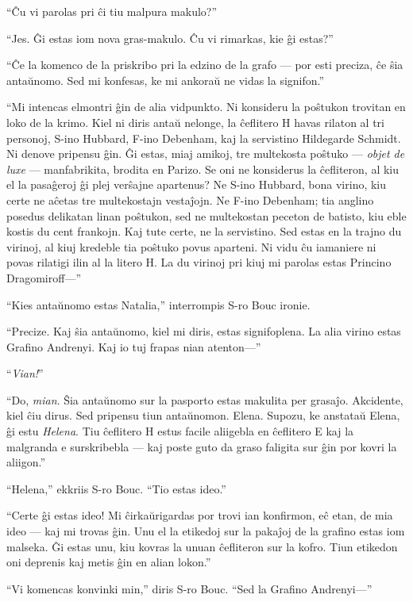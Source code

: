 ``Ĉu vi parolas pri ĉi tiu malpura makulo?''

``Jes. Ĝi estas iom nova gras-makulo. Ĉu vi rimarkas, kie ĝi estas?''

``Ĉe la komenco de la priskribo pri la edzino de la grafo --- por esti preciza, ĉe ŝia antaŭnomo. Sed mi konfesas, ke mi ankoraŭ ne vidas la signifon.''

``Mi intencas elmontri ĝin de alia vidpunkto. Ni konsideru la poŝtukon trovitan en loko de la krimo. Kiel ni diris antaŭ nelonge, la ĉeflitero H havas rilaton al tri personoj, S-ino Hubbard, F-ino Debenham, kaj la servistino Hildegarde Schmidt. Ni denove pripensu ĝin. Ĝi estas, miaj amikoj, tre multekosta poŝtuko --- \emph{objet de luxe} --- manfabrikita, brodita en Parizo. Se oni ne konsiderus la ĉefliteron, al kiu el la pasaĝeroj ĝi plej verŝajne apartenus? Ne S-ino Hubbard, bona virino, kiu certe ne aĉetas tre multekostajn vestaĵojn. Ne F-ino Debenham; tia anglino posedus delikatan linan poŝtukon, sed ne multekostan peceton de batisto, kiu eble kostis du cent frankojn. Kaj tute certe, ne la servistino. Sed estas en la trajno du virinoj, al kiuj kredeble tia poŝtuko povus aparteni. Ni vidu ĉu iamaniere ni povas rilatigi ilin al la litero H. La du virinoj pri kiuj mi parolas estas Princino Dragomiroff---''

``Kies antaŭnomo estas Natalia,'' interrompis S-ro Bouc ironie.

``Precize. Kaj ŝia antaŭnomo, kiel mi diris, estas signifoplena. La alia virino estas Grafino Andrenyi. Kaj io tuj frapas nian atenton---''

``\emph{Vian!}''

``Do, \emph{mian}. Ŝia antaŭnomo sur la pasporto estas makulita per grasaĵo. Akcidente, kiel ĉiu dirus. Sed pripensu tiun antaŭnomon. Elena. Supozu, ke anstataŭ Elena, ĝi estu \emph{Helena}. Tiu ĉeflitero H estus facile aliigebla en ĉeflitero E kaj la malgranda e surskribebla --- kaj poste guto da graso faligita sur ĝin por kovri la aliigon.''

``Helena,'' ekkriis S-ro Bouc. ``Tio estas ideo.''

``Certe ĝi estas ideo! Mi ĉirkaŭrigardas por trovi ian konfirmon, eĉ etan, de mia ideo --- kaj mi trovas ĝin. Unu el la etikedoj sur la pakaĵoj de la grafino estas iom malseka. Ĝi estas unu, kiu kovras la unuan ĉefliteron sur la kofro. Tiun etikedon oni deprenis kaj metis ĝin en alian lokon.''

``Vi komencas konvinki min,'' diris S-ro Bouc. ``Sed la Grafino Andrenyi---''

